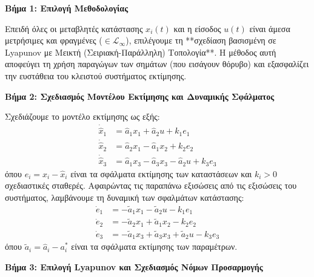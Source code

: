 \documentclass[a4paper,11pt]{article}
\begin{document}
\begin{answer}
\textbf{Βήμα 1: Επιλογή Μεθοδολογίας}

Επειδή όλες οι μεταβλητές κατάστασης $x_i(t)$ και η είσοδος $u(t)$ είναι άμεσα μετρήσιμες και φραγμένες ($\in \mathcal{L}_\infty$), επιλέγουμε τη **σχεδίαση βασισμένη σε Lyapunov με Μεικτή (Σειριακή-Παράλληλη) Τοπολογία**. Η μέθοδος αυτή αποφεύγει τη χρήση παραγώγων των σημάτων (που εισάγουν θόρυβο) και εξασφαλίζει την ευστάθεια του κλειστού συστήματος εκτίμησης.

\textbf{Βήμα 2: Σχεδιασμός Μοντέλου Εκτίμησης και Δυναμικής Σφάλματος}

Σχεδιάζουμε το μοντέλο εκτίμησης ως εξής:
\begin{align*}
    \dot{\hat{x}}_1 &= \hat{a}_1 x_1 + \hat{a}_2 u + k_1 e_1 \\
    \dot{\hat{x}}_2 &= \hat{a}_2 x_1 - \hat{a}_1 x_2 + k_2 e_2 \\
    \dot{\hat{x}}_3 &= \hat{a}_1 x_3 - \hat{a}_3 x_3 - \hat{a}_2 u + k_3 e_3
\end{align*}
όπου $e_i = x_i - \hat{x}_i$ είναι τα σφάλματα εκτίμησης των καταστάσεων και $k_i > 0$ σχεδιαστικές σταθερές.
Αφαιρώντας τις παραπάνω εξισώσεις από τις εξισώσεις του συστήματος, λαμβάνουμε τη δυναμική των σφαλμάτων κατάστασης:
\begin{align*}
    \dot{e}_1 &= -\tilde{a}_1 x_1 - \tilde{a}_2 u - k_1 e_1 \\
    \dot{e}_2 &= -\tilde{a}_2 x_1 + \tilde{a}_1 x_2 - k_2 e_2 \\
    \dot{e}_3 &= -\tilde{a}_1 x_3 + \tilde{a}_3 x_3 + \tilde{a}_2 u - k_3 e_3
\end{align*}
όπου $\tilde{a}_i = \hat{a}_i - a_i^*$ είναι τα σφάλματα εκτίμησης των παραμέτρων.

\textbf{Βήμα 3: Επιλογή Lyapunov και Σχεδιασμός Νόμων Προσαρμογής}


\end{answer}
\end{document}
